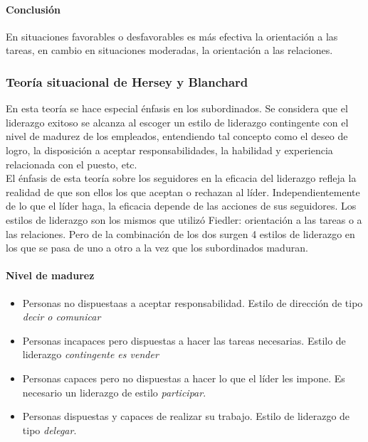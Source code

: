 \documentclass[12pt]{article}
\theoremstyle{definition_wo_parentheses}
\begin{document}
\paragraph{Conclusión} En situaciones favorables o desfavorables es más efectiva la orientación a las tareas, en cambio en situaciones moderadas, la orientación a las relaciones.
	
	
\subsubsection{Teoría situacional de Hersey y Blanchard}

En esta teoría se hace especial énfasis en los subordinados. Se considera que el liderazgo exitoso se alcanza al escoger un estilo de liderazgo contingente con el nivel de madurez de los empleados, entendiendo tal concepto como el deseo de logro, la disposición a aceptar responsabilidades, la habilidad y experiencia relacionada con el puesto, etc.\\
El énfasis de esta teoría sobre los seguidores en la eficacia del liderazgo refleja la realidad de que son ellos los que aceptan o rechazan al líder. Independientemente de lo que el líder haga, la eficacia depende de las acciones de sus seguidores. Los estilos de liderazgo son los mismos que utilizó Fiedler: orientación a las tareas o a las relaciones. Pero de la combinación de los dos surgen 4 estilos de liderazgo en los que se pasa de uno a otro a la vez que los subordinados maduran.

\paragraph{Nivel de madurez}
\begin{itemize}
\item Personas no dispuestaas a aceptar responsabilidad. Estilo de dirección de tipo \textit{decir o comunicar}
\item Personas incapaces pero dispuestas a hacer las tareas necesarias. Estilo de liderazgo \textit{contingente es vender}
\item Personas capaces pero no dispuestas a hacer lo que el líder les impone. Es necesario un liderazgo de estilo \textit{participar}.
\item Personas dispuestas y capaces de realizar su trabajo. Estilo de liderazgo de tipo \textit{delegar}.
\end{itemize}
\end{document}

